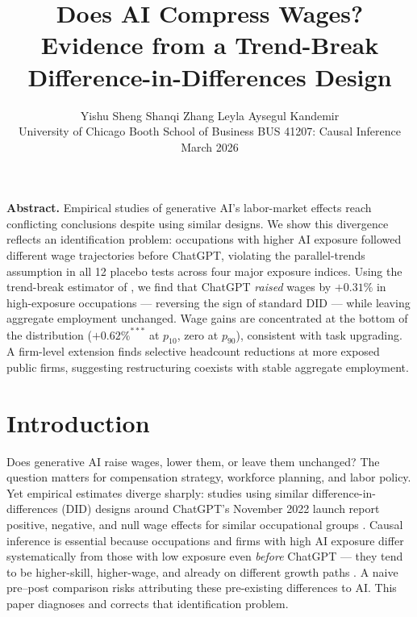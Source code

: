 \documentclass[12pt,a4paper]{article}
\title{\vspace{-2em}\large\bfseries Does AI Compress Wages?\\[0.2em]
\normalsize Evidence from a Trend-Break Difference-in-Differences Design}
\author{\small Yishu Sheng \quad Shanqi Zhang \quad Leyla Aysegul Kandemir\\[1pt]
\small University of Chicago Booth School of Business \quad
BUS 41207: Causal Inference \quad March 2026}
\date{}
\begin{document}
\maketitle
\vspace{-2em}

\begin{center}
\begin{minipage}{0.9\textwidth}
\footnotesize\setlength{\parindent}{0pt}
\textbf{Abstract.}
Empirical studies of generative AI's labor-market effects reach conflicting conclusions despite using similar designs. We show this divergence reflects an identification problem: occupations with higher AI exposure followed different wage trajectories before ChatGPT, violating the parallel-trends assumption in all 12 placebo tests across four major exposure indices. Using the trend-break estimator of \citet{wolfers2006}, we find that ChatGPT \emph{raised} wages by $+0.31\%$ in high-exposure occupations — reversing the sign of standard DID — while leaving aggregate employment unchanged. Wage gains are concentrated at the bottom of the distribution ($+0.62\%^{***}$ at $p_{10}$, zero at $p_{90}$), consistent with task upgrading. A firm-level extension finds selective headcount reductions at more exposed public firms, suggesting restructuring coexists with stable aggregate employment.
\end{minipage}
\end{center}

\vspace{4pt}

\section{Introduction}

Does generative AI raise wages, lower them, or leave them unchanged? The question matters for compensation strategy, workforce planning, and labor policy. Yet empirical estimates diverge sharply: studies using similar difference-in-differences (DID) designs around ChatGPT's November 2022 launch report positive, negative, and null wage effects for similar occupational groups \citep{acemoglu2022, brynjolfsson2025, hui2024}. Causal inference is essential because occupations and firms with high AI exposure differ systematically from those with low exposure even \emph{before} ChatGPT — they tend to be higher-skill, higher-wage, and already on different growth paths \citep{alm2003}. A naive pre–post comparison risks attributing these pre-existing differences to AI. This paper diagnoses and corrects that identification problem.
\end{document}
